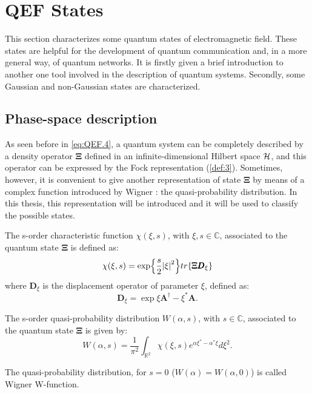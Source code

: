 \section{QEF States}
    This section characterizes some quantum states of electromagnetic field. These states are
    helpful for the development of quantum communication and, in a more general way, of quantum
    networks. It is firstly given a brief introduction to another one tool involved in the 
    description of quantum systems. Secondly, some Gaussian and non-Gaussian states 
    are characterized.

    \subsection{Phase-space description}
        As seen before in \ref{eq:QEF.4}, a quantum system can be completely
        described by a density operator $\pmb{\Xi}$ defined in an infinite-dimensional Hilbert space
        $\mathcal{H}$, and this operator can be expressed by the Fock representation (\ref{def:3}).
        Sometimes, however, it is convenient to give another representation of state $\pmb{\Xi}$ by
        means of a complex function introduced by Wigner \cite{Wigner}: the quasi-probability 
        distribution. In this thesis, this representation will be introduced and it will be used to
        classify the possible states.

        \begin{definition}
            The s-order characteristic function $\mathcal{\chi}(\xi,s)$, with $\xi,s\in\mathbb{C}$,
            associated to the quantum state $\pmb{\Xi}$ is defined as:
            \begin{equation}
                \mathcal{\chi}(\xi,s)=\exp{\frac{s}{2}\absolutevalue{\xi}^2}
                tr\{\pmb{\Xi}\pmb{D}_\xi\}
            \end{equation}
            where $\pmb{D}_\xi$ is  the displacement operator of parameter $\xi$, defined as:
            \begin{equation}
                \pmb{D}_\xi=\exp{\xi\pmb{A}^\dagger-\xi^*\pmb{A}}.
            \end{equation}
            \label{def:QEFStates.1}
        \end{definition}
        \begin{definition}
            The s-order quasi-probability distribution $W(\alpha,s)$, with $s\in\mathbb{C}$,
            associated to the quantum state $\mathbf{\Xi}$ is given by:
            \begin{equation}
                W(\alpha,s)=\frac{1}{\pi^2}\int_{\mathbb{R}^2} 
                \mathcal{\chi}(\xi,s)e^{\alpha\xi^*-\alpha^*\xi}d\xi^2.
            \end{equation}
            \label{def:QEFStates.2}
        \end{definition}
        The quasi-probability distribution, for $s=0$ ($W(\alpha)=W(\alpha,0)$) is called 
        Wigner W-function.
        
